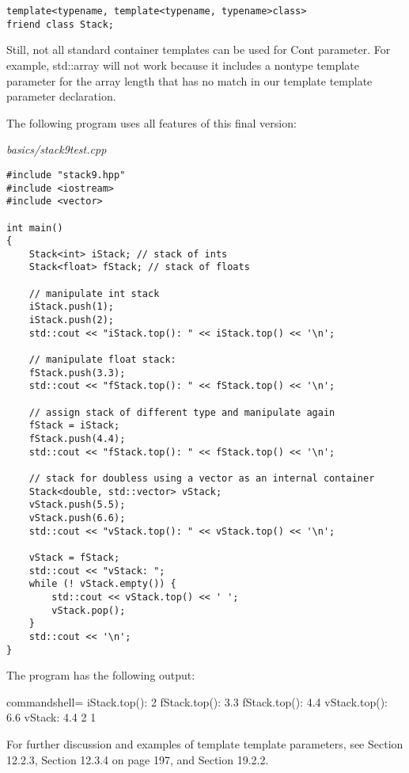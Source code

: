 \begin{lstlisting}[style=styleCXX]
template<typename, template<typename, typename>class>
friend class Stack;
\end{lstlisting}

Still, not all standard container templates can be used for Cont parameter. For example, std::array will not work because it includes a nontype template parameter for the array length that has no match in our template template parameter declaration.

The following program uses all features of this final version:

\noindent
\textit{basics/stack9test.cpp}
\begin{lstlisting}[style=styleCXX]
#include "stack9.hpp"
#include <iostream>
#include <vector>

int main()
{
	Stack<int> iStack; // stack of ints
	Stack<float> fStack; // stack of floats
	
	// manipulate int stack
	iStack.push(1);
	iStack.push(2);
	std::cout << "iStack.top(): " << iStack.top() << '\n';
	
	// manipulate float stack:
	fStack.push(3.3);
	std::cout << "fStack.top(): " << fStack.top() << '\n';
	
	// assign stack of different type and manipulate again
	fStack = iStack;
	fStack.push(4.4);
	std::cout << "fStack.top(): " << fStack.top() << '\n';
	
	// stack for doubless using a vector as an internal container
	Stack<double, std::vector> vStack;
	vStack.push(5.5);
	vStack.push(6.6);
	std::cout << "vStack.top(): " << vStack.top() << '\n';
	
	vStack = fStack;
	std::cout << "vStack: ";
	while (! vStack.empty()) {
		std::cout << vStack.top() << ' ';
		vStack.pop();
	}
	std::cout << '\n';
}
\end{lstlisting}

The program has the following output:

\begin{tcblisting}{commandshell={}}
iStack.top(): 2
fStack.top(): 3.3
fStack.top(): 4.4
vStack.top(): 6.6
vStack: 4.4 2 1
\end{tcblisting}

For further discussion and examples of template template parameters, see Section 12.2.3, Section 12.3.4 on page 197, and Section 19.2.2.





















